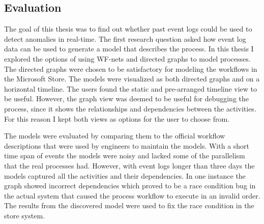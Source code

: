 \subsection{Evaluation}
\label{sec:evaluation}




The goal of this thesis was to find out whether past event logs could be used to detect anomalies in real-time. 
The first research question asked how event log data can be used to generate a model that describes the process.
In this thesis I explored the options of using WF-nets and directed graphs to model processes.
The directed graphs were chosen to be satisfactory for modeling the workflows in the Microsoft Store.
The models were visualized as both directed graphs and on a horizontal timeline.
The users found the static and pre-arranged timeline view to be useful. 
However, the graph view was deemed to be useful for debugging the process, since it shows the relationships and dependencies between the activities.
For this reason I kept both views as options for the user to choose from.

The models were evaluated by comparing them to the official workflow descriptions that were used by engineers to maintain the models. 
With a short time span of events the models were noisy and lacked some of the parallelism that the real processes had.
However, with event logs longer than three days the models captured all the activities and their dependencies.
In one instance the graph showed incorrect dependencies which proved to be a race condition bug in the actual system that caused the process workflow to execute in an invalid order.
The results from the discovered model were used to fix the race condition in the store system.

